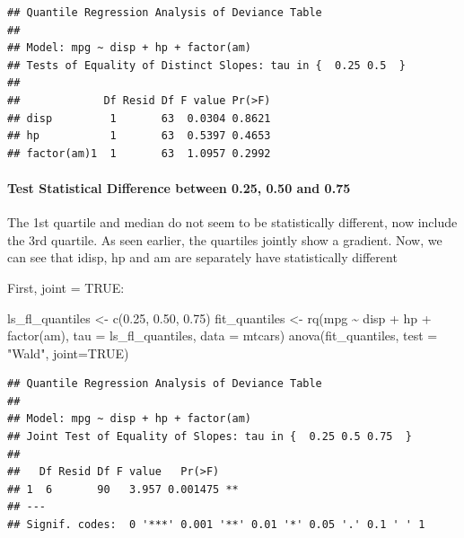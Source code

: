 \documentclass[
]{book}
\newenvironment{Shaded}{\begin{snugshade}}{\end{snugshade}}
\newcommand{\AttributeTok}[1]{\textcolor[rgb]{0.77,0.63,0.00}{#1}}
\newcommand{\ConstantTok}[1]{\textcolor[rgb]{0.00,0.00,0.00}{#1}}
\newcommand{\FloatTok}[1]{\textcolor[rgb]{0.00,0.00,0.81}{#1}}
\newcommand{\FunctionTok}[1]{\textcolor[rgb]{0.00,0.00,0.00}{#1}}
\newcommand{\NormalTok}[1]{#1}
\newcommand{\OtherTok}[1]{\textcolor[rgb]{0.56,0.35,0.01}{#1}}
\newcommand{\SpecialCharTok}[1]{\textcolor[rgb]{0.00,0.00,0.00}{#1}}
\newcommand{\StringTok}[1]{\textcolor[rgb]{0.31,0.60,0.02}{#1}}
\begin{document}
\begin{verbatim}
## Quantile Regression Analysis of Deviance Table
## 
## Model: mpg ~ disp + hp + factor(am)
## Tests of Equality of Distinct Slopes: tau in {  0.25 0.5  }
## 
##             Df Resid Df F value Pr(>F)
## disp         1       63  0.0304 0.8621
## hp           1       63  0.5397 0.4653
## factor(am)1  1       63  1.0957 0.2992
\end{verbatim}

\hypertarget{test-statistical-difference-between-0.25-0.50-and-0.75}{%
\paragraph{Test Statistical Difference between 0.25, 0.50 and 0.75}\label{test-statistical-difference-between-0.25-0.50-and-0.75}}

The 1st quartile and median do not seem to be statistically different, now include the 3rd quartile. As seen earlier, the quartiles jointly show a gradient. Now, we can see that idisp, hp and am are separately have statistically different

First, joint = TRUE:

\begin{Shaded}
\begin{Highlighting}[]
\NormalTok{ls\_fl\_quantiles }\OtherTok{\textless{}{-}} \FunctionTok{c}\NormalTok{(}\FloatTok{0.25}\NormalTok{, }\FloatTok{0.50}\NormalTok{, }\FloatTok{0.75}\NormalTok{)}
\NormalTok{fit\_quantiles }\OtherTok{\textless{}{-}} \FunctionTok{rq}\NormalTok{(mpg }\SpecialCharTok{\textasciitilde{}}\NormalTok{ disp }\SpecialCharTok{+}\NormalTok{ hp }\SpecialCharTok{+} \FunctionTok{factor}\NormalTok{(am),}
               \AttributeTok{tau =}\NormalTok{ ls\_fl\_quantiles,}
               \AttributeTok{data =}\NormalTok{ mtcars)}
\FunctionTok{anova}\NormalTok{(fit\_quantiles, }\AttributeTok{test =} \StringTok{"Wald"}\NormalTok{, }\AttributeTok{joint=}\ConstantTok{TRUE}\NormalTok{)}
\end{Highlighting}
\end{Shaded}

\begin{verbatim}
## Quantile Regression Analysis of Deviance Table
## 
## Model: mpg ~ disp + hp + factor(am)
## Joint Test of Equality of Slopes: tau in {  0.25 0.5 0.75  }
## 
##   Df Resid Df F value   Pr(>F)   
## 1  6       90   3.957 0.001475 **
## ---
## Signif. codes:  0 '***' 0.001 '**' 0.01 '*' 0.05 '.' 0.1 ' ' 1
\end{verbatim}
\end{document}
